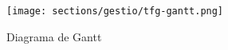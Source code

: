 \begin{landscape}
\begin{figure}[ht]
\begin{center}
\vspace{2cm}
\texttt{[image: sections/gestio/tfg-gantt.png]}
\end{center}
\caption{Diagrama de Gantt}
\label{fig:Gantt}
\end{figure}
\end{landscape}

